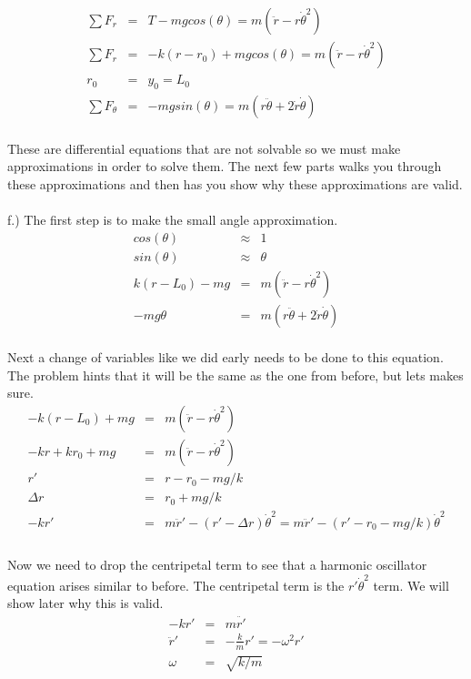 \documentclass[11pt]{amsart}
\begin{document}
\begin{eqnarray*}
\sum{F_{r}} &=& T-mgcos(\theta) = m(\ddot{r}-r\dot{\theta}^{2}) \\
\sum{F_{r}} &=& -k(r-r_{0})+mgcos(\theta) = m(\ddot{r}-r\dot{\theta}^{2}) \\
r_{0} &=& y_{0} = L_{0} \\
\sum{F_{\theta}} &=& -mgsin(\theta) = m(r\ddot{\theta}+2\dot{r}\dot{\theta}) 
\end{eqnarray*} \\
These are differential equations that are not solvable so we must make approximations in order to solve them. The next few parts walks you through these approximations and then has you show why these approximations are valid. \\ \\
f.) The first step is to make the small angle approximation. \\
\begin{eqnarray*}
cos(\theta) &\approx& 1 \\
sin(\theta) &\approx& \theta \\
k(r-L_{0})-mg &=& m(\ddot{r}-r\dot{\theta}^{2}) \\
-mg\theta &=& m(r\ddot{\theta}+2\dot{r}\dot{\theta}) 
\end{eqnarray*} \\
Next a change of variables like we did early needs to be done to this equation. The problem hints that it will be the same as the one from before, but lets makes sure. \\
\begin{eqnarray*}
-k(r-L_{0})+mg &=& m(\ddot{r}-r\dot{\theta}^{2}) \\
-kr+kr_{0} +mg &=& m(\ddot{r}-r\dot{\theta}^{2}) \\
r' &=& r-r_{0}-mg/k \\
\Delta{r} &=& r_{0} +mg/k \\
-kr' &=& m\ddot{r}' - (r'-\Delta{r})\dot{\theta}^{2} = m\ddot{r}' - (r'-r_{0}-mg/k)\dot{\theta}^{2}  \\
\end{eqnarray*} \\
Now we need to drop the centripetal term to see that a harmonic oscillator equation arises similar to before. The centripetal term is the $r'\dot{\theta}^{2}$ term. We will show later why this is valid. \\
\begin{eqnarray*}
-kr' &=& m\ddot{r'} \\
\ddot{r}' &=& -\frac{k}{m}r' = -\omega^{2}r' \\
\omega &=& \sqrt{k/m} 
\end{eqnarray*} \\
\end{document}
